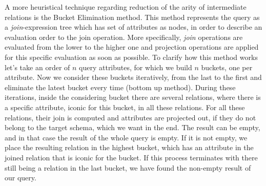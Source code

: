 A more heuristical technique regarding reduction of the arity of intermediate relations is the Bucket Elimination method. This method represents the query as a \textit{join}-expression tree which has set of attributes as nodes, in order to describe an evaluation order to the join operation. More specifically, \textit{join} operations are evaluated from the lower to the higher one and projection operations are applied for this specific evaluation as soon as possible. To clarify how this method works let's take an order of $n$ query attributes, for which we build $n$ buckets, one per attribute. Now we consider these buckets iteratively, from the last to the first and eliminate the latest bucket every time (bottom up method). During these iterations, inside the considering bucket there are several relations, where there is a specific attribute, iconic for this bucket, in all these relations. For all these relations, their join is computed and attributes are projected out, if they do not belong to the target schema, which we want in the end. The result can be empty, and in that case the result of the whole query is empty. If it is not empty, we place the resulting relation in the highest bucket, which has an attribute in the joined relation that is iconic for the bucket. If this process terminates with there still being a relation in the last bucket, we have found the non-empty result of our query.